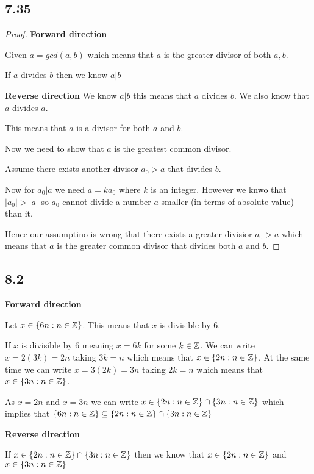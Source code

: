 \documentclass[a4paper]{report}
\begin{document}
\subsection*{7.35}
\begin{proof}
    \textbf{Forward direction}

    Given $a = gcd(a,b)$ which means that $a$ is the greater divisor of both $a,b$.

    If  $a$ divides $b$ then we know $a | b$

    \textbf{Reverse direction}
    We know $a | b$ this means that $a$ divides $b$. We also know that $a$ divides $a$.

    This means that $a$ is a divisor for both  $a$ and $b$.

    Now we need to show that  $a$ is the greatest common divisor.

    Assume there exists another divisor $a_0 > a$ that divides $b$.

    Now  for $a_0 | a$ we need $a = ka_0$ where $k$ is an integer. However we knwo that $|a_0| > |a|$ so $a_0$ cannot divide a number $a$ smaller (in terms of absolute value) than it.

    Hence our assumptino is wrong that there exists a greater divisior $a_0>a$ which means that $a$ is the greater common divisor that divides both $a$ and $b$.


\end{proof}

\subsection*{8.2}
\textbf{Forward direction}

Let $x \in \{6n: n \in \mathbb{Z}\}$. This means that  $x$ is divisible by  $6$.

If  $x$ is divisible by $6$ meaning $x = 6k$ for some  $k \in \mathbb{Z}$. We can write  $x = 2(3k) = 2n$ taking $3k = n$ which means that  $x \in \{2n : n \in \mathbb{Z}\}$. At the same time we can write  $x = 3(2k) = 3n$ taking  $2k = n$ which means that  $x \in \{3n : n \in \mathbb{Z}\}$.

As $x = 2n$ and $x = 3n$ we can write $x \in \{2n : n \in \mathbb{Z}\} \cap  \{3n : n \in \mathbb{Z}\}$ which implies that $\{6n:n \in \mathbb{Z}\} \subseteq \{2n : n \in \mathbb{Z} \} \cap \{3n : n \in \mathbb{Z}\}$

\textbf{Reverse direction}

If $x \in \{2n : n \in \mathbb{Z} \} \cap \{3n : n \in \mathbb{Z}\}$ then we know that $x \in \{2n : n \in \mathbb{Z} \}$ and $x \in \{3n : n \in \mathbb{Z}\}$
\end{document}

